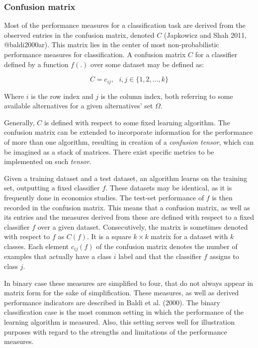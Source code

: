 \documentclass[12pt,]{article}
\begin{document}
\hypertarget{confusion-matrix}{%
\subsubsection{Confusion matrix}\label{confusion-matrix}}

Most of the performance measures for a classification task are derived
from the observed entries in the confusion matrix, denoted \(C\)
(Japkowicz and Shah 2011, @baldi2000ar). This matrix lies in the center
of most non-probabilistic performance measures for classification. A
confusion matrix \(C\) for a classifier defined by a function \(f(.)\)
over some dataset may be defined as:

\begin{equation}
C = {c_{ij}}, \text{  } i, j \in \{1, 2, \dots, k\}
\end{equation}

Where \(i\) is the row index and \(j\) is the column index, both
referring to some available alternatives for a given alternatives' set
\(\Omega\).

Generally, \(C\) is defined with respect to some fixed learning
algorithm. The confusion matrix can be extended to incorporate
information for the performance of more than one algorithm, resulting in
creation of a \emph{confusion tensor}, which can be imagined as a stack
of matrices. There exist specific metrics to be implemented on such
\emph{tensor}.

Given a training dataset and a test dataset, an algorithm learns on the
training set, outputting a fixed classifier \(f\). These datasets may be
identical, as it is frequently done in economics studies. The test-set
performance of \(f\) is then recorded in the confusion matrix. This
means that a confusion matrix, as well as its entries and the measures
derived from these are defined with respect to a fixed classifier \(f\)
over a given dataset. Consecutively, the matrix is sometimes denoted
with respect to \(f\) as \(C(f)\). It is a square \(k \times k\) matrix
for a dataset with \(k\) classes. Each element \(c_{ij}(f)\) of the
confusion matrix denotes the number of examples that actually have a
class \(i\) label and that the classifier \(f\) assigns to class \(j\).

In binary case these measures are simplified to four, that do not always
appear in matrix form for the sake of simplification. These measures, as
well as derived performance indicators are described in Baldi et al.
(2000). The binary classification case is the most common setting in
which the performance of the learning algorithm is measured. Also, this
setting serves well for illustration purposes with regard to the
strengths and limitations of the performance measures.
\end{document}

